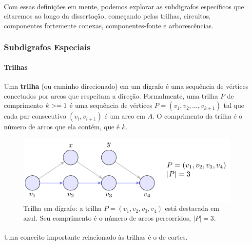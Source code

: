 \documentclass[12pt,a4paper]{article}
\def\geq{\string>=}%
\begin{document}
\paragraph{}
Com essas definições em mente, podemos explorar as subdigrafos específicos que citaremos ao longo da dissertação, começando pelas trilhas, circuitos, componentes fortemente conexas, componentes-fonte e arborescências.

\subsubsection{Subdigrafos Especiais}

\paragraph{Trilhas}

\paragraph{}
Uma \textbf{trilha} (ou caminho direcionado) em um dígrafo é uma sequência de vértices conectados por arcos que respeitam a direção. Formalmente, uma trilha \(P\) de comprimento \(k \geq 1\) é uma sequência de vértices \(P = (v_1, v_2, \ldots, v_{k+1})\) tal que cada par consecutivo \((v_i, v_{i+1})\) é um arco em \(A\). O comprimento da trilha é o número de arcos que ela contém, que é \(k\).


\begin{figure}[H]
    \centering
    \includegraphics[width=0.9\linewidth]{figures/fig_trilha.pdf}

    \caption{Trilha em dígrafo: a trilha $P=(v_1,v_2,v_3,v_4)$ está destacada em azul. Seu comprimento é o número de arcos percorridos, $|P|=3$.}
    \label{fig:trilha}\end{figure}


\paragraph{}
Uma conceito importante relacionado às trilhas é o de cortes. 
\end{document}
